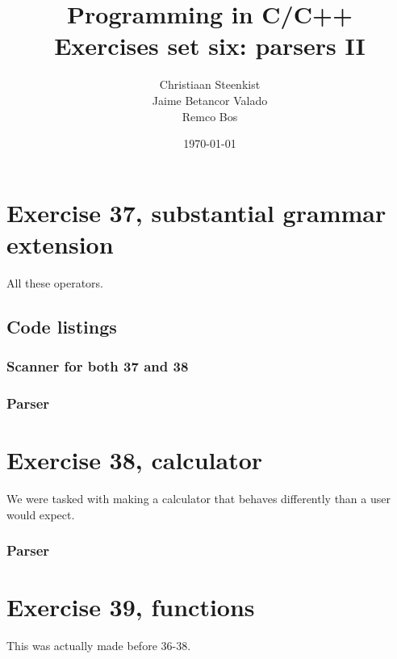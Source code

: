 \documentclass[11pt]{article}
\begin{document}
\title{Programming in C/C++ \\
       Exercises set six: parsers II
}
\date{\today}
\author{Christiaan Steenkist \\
Jaime Betancor Valado \\
Remco Bos \\
}

\maketitle
\section*{Exercise 37, substantial grammar extension}
All these operators.

\subsection*{Code listings}
\subsubsection*{Scanner for both 37 and 38}


\subsubsection*{Parser}




\section*{Exercise 38, calculator}
We were tasked with making a calculator that behaves differently than a user would expect.

\subsubsection*{Parser}



\section*{Exercise 39, functions}
This was actually made before 36-38.
\end{document}
